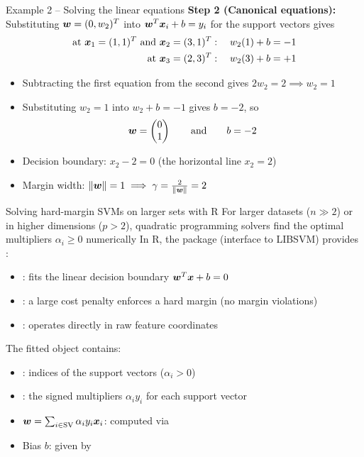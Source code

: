 \documentclass[aspectratio=169]{beamer}\usepackage[]{graphicx}\usepackage[]{xcolor}
\begin{document}
\begin{frame}{Example 2 -- Solving the linear equations}
    \textbf{Step 2 (Canonical equations):} Substituting $\bm{w} = (0, w_2)^T$ into $\bm{w}^T \bm{x}_i + b = y_i$ for the support vectors gives
    \begin{align*}
        \text{at } \bm{x}_1 = (1, 1)^T \text{ and } \bm{x}_2 = (3, 1)^T: \quad w_2(1) + b &= -1 \\
        \text{at } \bm{x}_3 = (2, 3)^T: \quad w_2(3) + b &= +1
    \end{align*}
    \vfill
    \begin{itemize}
        \item Subtracting the first equation from the second gives $2w_2 = 2 \implies w_2 = 1$
        \item Substituting $w_2 = 1$ into $w_2 + b = -1$ gives $b = -2$, so
        \[
            \bm{w} = \begin{pmatrix} 0 \\ 1 \end{pmatrix} \qquad \text{and} \qquad b = -2
        \]
        \item Decision boundary: $x_2 - 2 = 0$ (the horizontal line $x_2 = 2$)
        \item Margin width: $\|\bm{w}\| = 1 \implies \gamma = \frac{2}{\|\bm{w}\|} = 2$
    \end{itemize}
\end{frame}




\begin{frame}{Solving hard-margin SVMs on larger sets with \textsf{R}}
    For larger datasets ($n \gg 2$) or in higher dimensions ($p > 2$), quadratic programming solvers find the optimal multipliers $\alpha_i \ge 0$ numerically
    \vfill
    In \textsf{R}, the package  (interface to \textsf{LIBSVM}) provides :
    \vskip0.1cm
    \centering{}
    \vskip0.15cm
    \raggedright
    \begin{itemize}
        \item {}: fits the linear decision boundary $\bm{w}^T \bm{x} + b = 0$
        \item {}: a large cost penalty enforces a hard margin (no margin violations)
        \item {}: operates directly in raw feature coordinates
    \end{itemize}
    \vfill
    The fitted object contains:
    \begin{itemize}
        \item {}: indices of the support vectors ($\alpha_i > 0$)
        \item {}: the signed multipliers $\alpha_i y_i$ for each support vector
        \item $\bm{w} = \sum_{i \in \text{SV}} \alpha_i y_i \bm{x}_i$: computed via 
        \item Bias $b$: given by 
    \end{itemize}
\end{frame}
\end{document}
